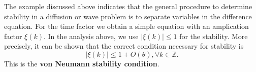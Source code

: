 \documentclass{article}
\begin{document}
The example discussed above indicates that the general procedure to determine stability in a diffusion or wave problem is to separate variables in the difference equation. For the time factor we obtain a simple equation with an amplication factor $\xi(k)$. 
In the analysis above, we use $|\xi(k)| \le 1$ for the stability. More precisely, it can be shown that the correct condition necessary for stability is
$$|\xi(k)| \le 1 + O(\theta), \forall k\in \mathbb Z.$$
This is the {\bf von Neumann stability condition}.
\end{document}
